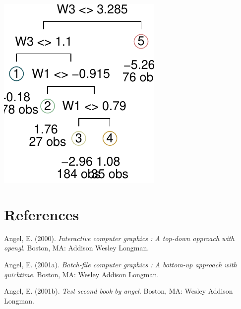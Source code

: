 \documentclass[12pt,twoside]{reedthesis}
\begin{document}
  \begin{center}\includegraphics{Thesis_files/figure-latex/ctree-2} \end{center}
  
  \backmatter
  
  \chapter{References}\label{references}
  
  \noindent
  
  \setlength{\parindent}{-0.20in} \setlength{\leftskip}{0.20in}
  \setlength{\parskip}{8pt}
  
  \hypertarget{refs}{}
  \hypertarget{ref-angel2000}{}
  Angel, E. (2000). \emph{Interactive computer graphics : A top-down
  approach with opengl}. Boston, MA: Addison Wesley Longman.
  
  \hypertarget{ref-angel2001}{}
  Angel, E. (2001a). \emph{Batch-file computer graphics : A bottom-up
  approach with quicktime}. Boston, MA: Wesley Addison Longman.
  
  \hypertarget{ref-angel2002a}{}
  Angel, E. (2001b). \emph{Test second book by angel}. Boston, MA: Wesley
  Addison Longman.


\end{document}
